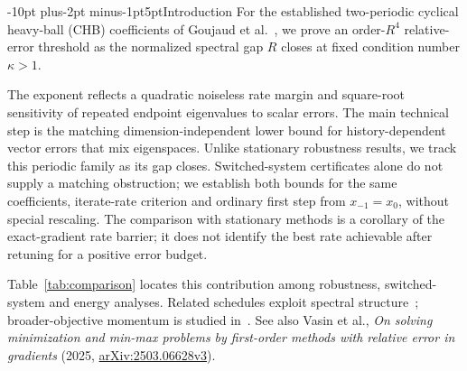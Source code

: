 \documentclass[pdflatex,sn-mathphys-num]{sn-jnl}
\makeatletter
\renewcommand\section{\@startsection{section}{1}{\z@}%
  {-10pt plus-2pt minus-1pt}{5pt}{\sectionfont}}
\theoremstyle{thmstyleone}
\theoremstyle{thmstyletwo}
\makeatother
\begin{document}
\section{Introduction}
For the established two-periodic cyclical heavy-ball (CHB) coefficients of
Goujaud et al.~\cite[Algorithm 2 and Corollary 3.2]{goujaud2022}, we prove
an order-$R^4$ relative-error threshold as the normalized spectral gap $R$
closes at fixed condition number $\kappa>1$.

The exponent reflects a quadratic noiseless rate margin and square-root
sensitivity of repeated endpoint eigenvalues to scalar errors. The main
technical step is the matching dimension-independent lower bound for
history-dependent vector errors that mix eigenspaces. Unlike stationary
robustness results, we track this periodic family as its gap closes.
Switched-system certificates alone do not supply a matching obstruction;
we establish both bounds for the same coefficients, iterate-rate criterion
and ordinary first step from $x_{-1}=x_0$, without special rescaling. The comparison with stationary methods is a
corollary of the exact-gradient rate barrier; it does not identify the
best rate achievable after retuning for a positive error budget.

Table~\ref{tab:comparison} locates this contribution among robustness,
switched-system and energy analyses. Related schedules exploit spectral structure~\cite{oymak2021,agarwal2021}; broader-objective momentum is studied
in~\cite{khanh2026}. See also Vasin et al., \emph{On solving minimization
and min-max problems by first-order methods with relative error in gradients}
(2025, \href{https://arxiv.org/abs/2503.06628v3}{arXiv:2503.06628v3}).
\end{document}
